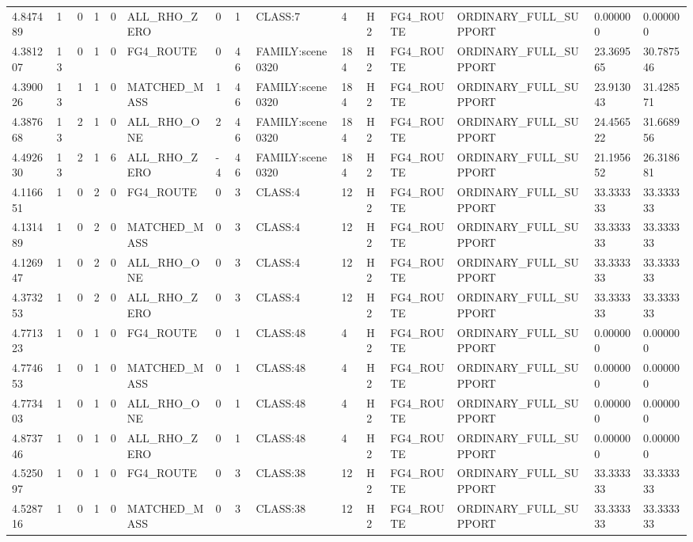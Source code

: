 \begin{tabular}{lllllllllllllll}
4.847489 & 1 & 0 & 1 & 0 & ALL\_RHO\_ZERO & 0 & 1 & CLASS:7 & 4 & H2 & FG4\_ROUTE & ORDINARY\_FULL\_SUPPORT & 0.000000 & 0.000000 \\
4.381207 & 13 & 0 & 1 & 0 & FG4\_ROUTE & 0 & 46 & FAMILY:scene0320 & 184 & H2 & FG4\_ROUTE & ORDINARY\_FULL\_SUPPORT & 23.369565 & 30.787546 \\
4.390026 & 13 & 1 & 1 & 0 & MATCHED\_MASS & 1 & 46 & FAMILY:scene0320 & 184 & H2 & FG4\_ROUTE & ORDINARY\_FULL\_SUPPORT & 23.913043 & 31.428571 \\
4.387668 & 13 & 2 & 1 & 0 & ALL\_RHO\_ONE & 2 & 46 & FAMILY:scene0320 & 184 & H2 & FG4\_ROUTE & ORDINARY\_FULL\_SUPPORT & 24.456522 & 31.668956 \\
4.492630 & 13 & 2 & 1 & 6 & ALL\_RHO\_ZERO & -4 & 46 & FAMILY:scene0320 & 184 & H2 & FG4\_ROUTE & ORDINARY\_FULL\_SUPPORT & 21.195652 & 26.318681 \\
4.116651 & 1 & 0 & 2 & 0 & FG4\_ROUTE & 0 & 3 & CLASS:4 & 12 & H2 & FG4\_ROUTE & ORDINARY\_FULL\_SUPPORT & 33.333333 & 33.333333 \\
4.131489 & 1 & 0 & 2 & 0 & MATCHED\_MASS & 0 & 3 & CLASS:4 & 12 & H2 & FG4\_ROUTE & ORDINARY\_FULL\_SUPPORT & 33.333333 & 33.333333 \\
4.126947 & 1 & 0 & 2 & 0 & ALL\_RHO\_ONE & 0 & 3 & CLASS:4 & 12 & H2 & FG4\_ROUTE & ORDINARY\_FULL\_SUPPORT & 33.333333 & 33.333333 \\
4.373253 & 1 & 0 & 2 & 0 & ALL\_RHO\_ZERO & 0 & 3 & CLASS:4 & 12 & H2 & FG4\_ROUTE & ORDINARY\_FULL\_SUPPORT & 33.333333 & 33.333333 \\
4.771323 & 1 & 0 & 1 & 0 & FG4\_ROUTE & 0 & 1 & CLASS:48 & 4 & H2 & FG4\_ROUTE & ORDINARY\_FULL\_SUPPORT & 0.000000 & 0.000000 \\
4.774653 & 1 & 0 & 1 & 0 & MATCHED\_MASS & 0 & 1 & CLASS:48 & 4 & H2 & FG4\_ROUTE & ORDINARY\_FULL\_SUPPORT & 0.000000 & 0.000000 \\
4.773403 & 1 & 0 & 1 & 0 & ALL\_RHO\_ONE & 0 & 1 & CLASS:48 & 4 & H2 & FG4\_ROUTE & ORDINARY\_FULL\_SUPPORT & 0.000000 & 0.000000 \\
4.873746 & 1 & 0 & 1 & 0 & ALL\_RHO\_ZERO & 0 & 1 & CLASS:48 & 4 & H2 & FG4\_ROUTE & ORDINARY\_FULL\_SUPPORT & 0.000000 & 0.000000 \\
4.525097 & 1 & 0 & 1 & 0 & FG4\_ROUTE & 0 & 3 & CLASS:38 & 12 & H2 & FG4\_ROUTE & ORDINARY\_FULL\_SUPPORT & 33.333333 & 33.333333 \\
4.528716 & 1 & 0 & 1 & 0 & MATCHED\_MASS & 0 & 3 & CLASS:38 & 12 & H2 & FG4\_ROUTE & ORDINARY\_FULL\_SUPPORT & 33.333333 & 33.333333 \\

\end{tabular}
